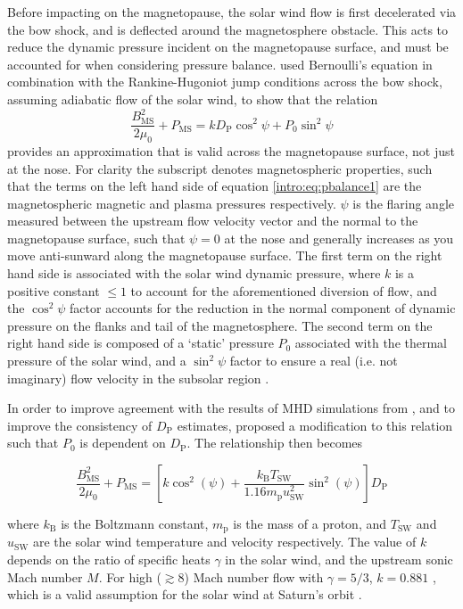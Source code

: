 Before impacting on the magnetopause, the solar wind flow is first decelerated via the bow shock, and is deflected around the magnetosphere obstacle. This acts to reduce the dynamic pressure incident on the magnetopause surface, and must be accounted for when considering pressure balance. \citet{petrinec1997} used Bernoulli's equation in combination with the Rankine-Hugoniot jump conditions across the bow shock, assuming adiabatic flow of the solar wind, to show that the relation
\begin{equation}\label{intro:eq:pbalance1}
\frac{B_{\mathrm{MS}}^2}{2\mu_0} + P_{\mathrm{MS}} = kD_\mathrm{P}\cos^2\psi + P_0\sin^2\psi
\end{equation}
provides an approximation that is valid across the magnetopause surface, not just at the nose. For clarity the subscript {} denotes magnetospheric properties, such that the terms on the left hand side of equation \ref{intro:eq:pbalance1} are the magnetospheric magnetic and plasma pressures respectively. $\psi$ is the flaring angle measured between the upstream flow velocity vector and the normal to the magnetopause surface, such that $\psi=0$ at the nose and generally increases as you move anti-sunward along the magnetopause surface. The first term on the right hand side is associated with the solar wind dynamic pressure, where $k$ is a positive constant $\leq1$ to account for the aforementioned diversion of flow, and the $\cos^2\psi$ factor accounts for the reduction in the normal component of dynamic pressure on the flanks and tail of the magnetosphere. The second term on the right hand side is composed of a `static' pressure $P_0$ associated with the thermal pressure of the solar wind, and a $\sin^2\psi$ factor to ensure a real (i.e. not imaginary) flow velocity in the subsolar region \citep[see][]{petrinec1997}.

In order to improve agreement with the results of MHD simulations from \citet{hansen2005}, and to improve the consistency of $D_\mathrm{P}$ estimates, \citet{kanani2010} proposed a modification to this relation such that $P_0$ is dependent on $D_\mathrm{P}$. The relationship then becomes

\begin{equation}\label{intro:eq:pbalance2}
\frac{B_\mathrm{MS}^2}{2\mu_0} + P_\mathrm{MS} = \left[k\cos^2(\psi) + \frac{k_\mathrm{B}T_\mathrm{SW}}{1.16m_\mathrm{p}u_\mathrm{SW}^2}\sin^2(\psi)\right] D_\mathrm{P}
\end{equation}

where $k_\mathrm{B}$ is the Boltzmann constant, $m_\mathrm{p}$ is the mass of a proton, and $T_\mathrm{SW}$ and $u_\mathrm{SW}$ are the solar wind temperature and velocity respectively. The value of $k$ depends on the ratio of specific heats $\gamma$ in the solar wind, and the upstream sonic Mach number $M$. For high (${\gtrsim}8$) Mach number flow with $\gamma = 5/3$, $k = 0.881$ \citep{spreiter1966}, which is a valid assumption for the solar wind at Saturn's orbit \cite[e.g.][]{slavin1985,achilleos2006}.

